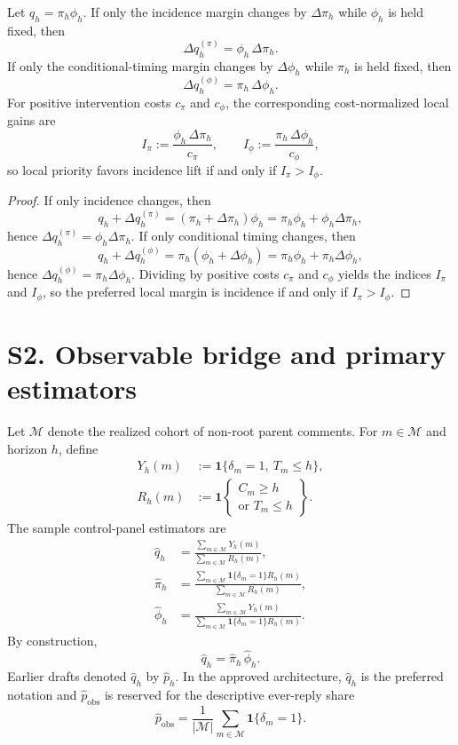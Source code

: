 \begin{proposition}
Let \(q_h=\pi_h\phi_h\). If only the incidence margin changes by
\(\Delta \pi_h\) while \(\phi_h\) is held fixed, then
\[
\Delta q_h^{(\pi)}=\phi_h\,\Delta \pi_h.
\]
If only the conditional-timing margin changes by \(\Delta \phi_h\) while
\(\pi_h\) is held fixed, then
\[
\Delta q_h^{(\phi)}=\pi_h\,\Delta \phi_h.
\]
For positive intervention costs \(c_\pi\) and \(c_\phi\), the corresponding
cost-normalized local gains are
\[
I_\pi:=\frac{\phi_h\,\Delta \pi_h}{c_\pi},
\qquad
I_\phi:=\frac{\pi_h\,\Delta \phi_h}{c_\phi},
\]
so local priority favors incidence lift if and only if \(I_\pi>I_\phi\).
\end{proposition}

\begin{proof}
If only incidence changes, then
\[
q_h+\Delta q_h^{(\pi)}
=
(\pi_h+\Delta \pi_h)\phi_h
=
\pi_h\phi_h+\phi_h\Delta \pi_h,
\]
hence \(\Delta q_h^{(\pi)}=\phi_h\Delta \pi_h\). If only conditional timing
changes, then
\[
q_h+\Delta q_h^{(\phi)}
=
\pi_h(\phi_h+\Delta \phi_h)
=
\pi_h\phi_h+\pi_h\Delta \phi_h,
\]
hence \(\Delta q_h^{(\phi)}=\pi_h\Delta \phi_h\). Dividing by positive costs
\(c_\pi\) and \(c_\phi\) yields the indices \(I_\pi\) and \(I_\phi\), so the
preferred local margin is incidence if and only if \(I_\pi>I_\phi\).
\end{proof}

\section*{S2. Observable bridge and primary estimators}
\SupplementMixedEvidenceNote

Let \(\mathcal{M}\) denote the realized cohort of non-root parent comments.
For \(m\in\mathcal{M}\) and horizon \(h\), define
\[
\begin{aligned}
Y_h(m)&:=\mathbf{1}\{\delta_m=1,\ T_m\le h\},\\
R_h(m)&:=\mathbf{1}\!\left\{\substack{C_m\ge h\\ \text{or } T_m\le h}\right\}.
\end{aligned}
\]
The sample control-panel estimators are
\begin{align*}
\widehat q_h
&=
\frac{\sum_{m\in\mathcal{M}} Y_h(m)}
     {\sum_{m\in\mathcal{M}} R_h(m)},
\\
\widehat \pi_h
&=
\frac{\sum_{m\in\mathcal{M}} \mathbf{1}\{\delta_m=1\}R_h(m)}
     {\sum_{m\in\mathcal{M}} R_h(m)},
\\
\widehat \phi_h
&=
\frac{\sum_{m\in\mathcal{M}} Y_h(m)}
     {\sum_{m\in\mathcal{M}} \mathbf{1}\{\delta_m=1\}R_h(m)}.
\end{align*}
By construction,
\[
\widehat q_h=\widehat \pi_h\,\widehat \phi_h.
\]
Earlier drafts denoted \(\widehat q_h\) by \(\widehat p_h\). In the approved
architecture, \(\widehat q_h\) is the preferred notation and
\(\widehat p_{\mathrm{obs}}\) is reserved for the descriptive ever-reply share
\[
\widehat p_{\mathrm{obs}}
=
\frac{1}{|\mathcal{M}|}\sum_{m\in\mathcal{M}} \mathbf{1}\{\delta_m=1\}.
\]

